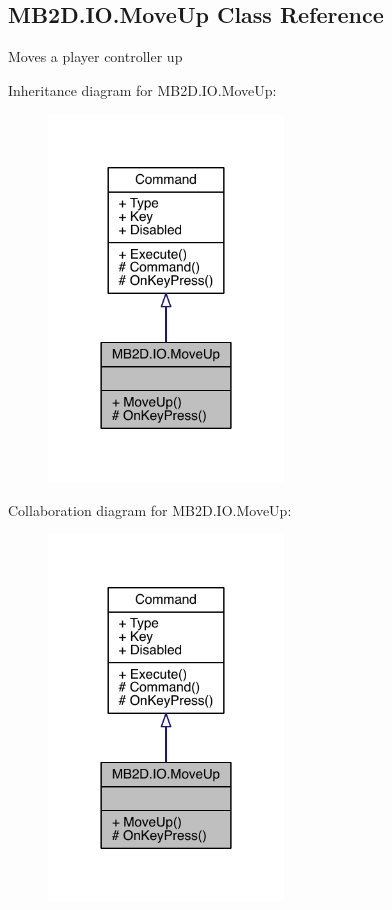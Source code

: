\hypertarget{class_m_b2_d_1_1_i_o_1_1_move_up}{}\subsection{M\+B2\+D.\+I\+O.\+Move\+Up Class Reference}
\label{class_m_b2_d_1_1_i_o_1_1_move_up}


Moves a player controller up  




Inheritance diagram for M\+B2\+D.\+I\+O.\+Move\+Up\+:
\nopagebreak
\begin{figure}[H]
\begin{center}
\leavevmode
\includegraphics[width=177pt]{class_m_b2_d_1_1_i_o_1_1_move_up__inherit__graph}
\end{center}
\end{figure}


Collaboration diagram for M\+B2\+D.\+I\+O.\+Move\+Up\+:
\nopagebreak
\begin{figure}[H]
\begin{center}
\leavevmode
\includegraphics[width=177pt]{class_m_b2_d_1_1_i_o_1_1_move_up__coll__graph}
\end{center}
\end{figure}
